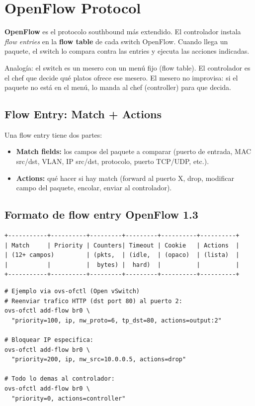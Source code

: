 \section{ OpenFlow Protocol}

\begin{concepto}
\textbf{OpenFlow} es el protocolo southbound más extendido. El controlador instala
\emph{flow entries} en la \textbf{flow table} de cada switch OpenFlow. Cuando llega
un paquete, el switch lo compara contra las entries y ejecuta las acciones indicadas.

Analogía: el switch es un mesero con un menú fijo (flow table). El controlador es el
chef que decide qué platos ofrece ese mesero. El mesero no improvisa: si el paquete
no está en el menú, lo manda al chef (controller) para que decida.
\end{concepto}

\subsection{Flow Entry: Match + Actions}

Una flow entry tiene dos partes:

\begin{itemize}
    \item \textbf{Match fields:} los campos del paquete a comparar (puerto de entrada,
          MAC src/dst, VLAN, IP src/dst, protocolo, puerto TCP/UDP, etc.).
    \item \textbf{Actions:} qué hacer si hay match (forward al puerto X, drop, modificar
          campo del paquete, encolar, enviar al controlador).
\end{itemize}

\subsection{Formato de flow entry OpenFlow 1.3}

\begin{lstlisting}
+-----------+----------+---------+---------+----------+----------+
| Match     | Priority | Counters| Timeout | Cookie   | Actions  |
| (12+ campos)         | (pkts,  | (idle,  | (opaco)  | (lista)  |
|           |          |  bytes) |  hard)  |          |          |
+-----------+----------+---------+---------+----------+----------+
\end{lstlisting}

\begin{codigo}
\begin{lstlisting}
# Ejemplo via ovs-ofctl (Open vSwitch)
# Reenviar trafico HTTP (dst port 80) al puerto 2:
ovs-ofctl add-flow br0 \
  "priority=100, ip, nw_proto=6, tp_dst=80, actions=output:2"

# Bloquear IP especifica:
ovs-ofctl add-flow br0 \
  "priority=200, ip, nw_src=10.0.0.5, actions=drop"

# Todo lo demas al controlador:
ovs-ofctl add-flow br0 \
  "priority=0, actions=controller"
\end{lstlisting}
\end{codigo}

